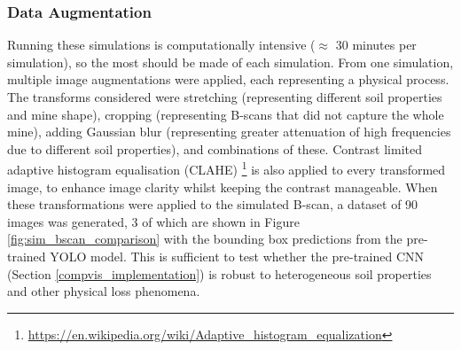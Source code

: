     
    \subsubsection{Data Augmentation}

      Running these simulations is computationally intensive (\(\approx\) 30 minutes per simulation), so the most should be made of each simulation. From one simulation, multiple image augmentations were applied, each representing a physical process. The transforms considered were stretching (representing different soil properties and mine shape), cropping (representing B-scans that did not capture the whole mine), adding Gaussian blur (representing greater attenuation of high frequencies due to different soil properties), and combinations of these. Contrast limited adaptive histogram equalisation (CLAHE) \footnote{\url{https://en.wikipedia.org/wiki/Adaptive_histogram_equalization}} is also applied to every transformed image, to enhance image clarity whilst keeping the contrast manageable. When these transformations were applied to the simulated B-scan, a dataset of 90 images was generated, 3 of which are shown in Figure \ref{fig:sim_bscan_comparison} with the bounding box predictions from the pre-trained YOLO model. This is sufficient to test whether the pre-trained CNN (Section \ref{compvis_implementation}) is robust to heterogeneous soil properties and other physical loss phenomena.

